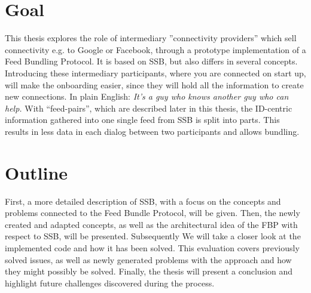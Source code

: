 \section{Goal}
This thesis explores the role of intermediary ”connectivity providers” which sell connectivity e.g. to Google or Facebook, through a prototype implementation of a Feed Bundling Protocol. It is based on SSB, but also differs in several concepts. Introducing these intermediary participants, where you are connected on start up, will make the onboarding easier, since they will hold all the information to create new connections. In plain English: \textit{It’s a guy who knows another guy who can help.} With “feed-pairs”, which are described later in this thesis, the ID-centric information gathered into one single feed from SSB is split into parts. This results in less data in each dialog between two participants and allows bundling. 

\section{Outline}
First, a more detailed description of SSB, with a focus on the concepts and problems connected to the Feed Bundle Protocol, will be given. Then, the newly created and adapted concepts, as well as the architectural idea of the FBP with respect to SSB, will be presented. Subsequently We will take a closer look at the implemented code and how it has been solved. This evaluation covers previously solved issues, as well as newly generated problems with the approach and how they might possibly be solved. Finally, the thesis will present a conclusion and highlight future challenges discovered during the process. 

